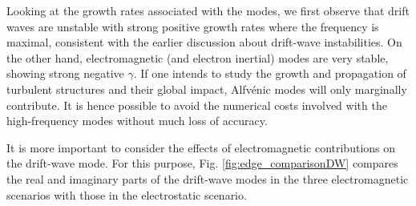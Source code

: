 Looking at the growth rates associated with the modes, we first observe that drift waves are unstable with strong positive growth rates where the frequency is maximal, consistent with the earlier discussion about drift-wave instabilities. On the other hand, electromagnetic (and electron inertial) modes are very stable, showing strong negative $\gamma$. If one intends to study the growth and propagation of turbulent structures and their global impact, Alfvénic modes will only marginally contribute. It is hence possible to avoid the numerical costs involved with the high-frequency modes without much loss of accuracy.

It is more important to consider the effects of electromagnetic contributions on the drift-wave mode. For this purpose, Fig. \ref{fig:edge_comparisonDW} compares the real and imaginary parts of the drift-wave modes in the three electromagnetic scenarios with those in the electrostatic scenario.

